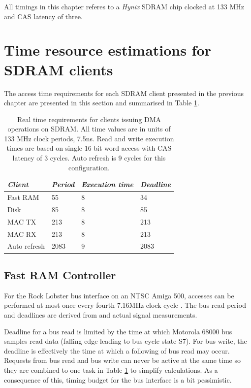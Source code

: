 \documentclass[a4paper]{report}
\begin{document}
All timings in this chapter referes to a \emph{Hynix} SDRAM
chip clocked at 133 MHz and CAS latency of three.

\section{Time resource estimations for SDRAM clients}
The access time requirements for each SDRAM client presented
in the previous chapter are presented in this section and
summarised in Table \ref{sdram_clients}.

\begin{table}
\begin{tabular}{*4l}    \toprule
\emph{Client} & \emph{Period} & \emph{Execution time} & \emph{Deadline} \\
\midrule
Fast RAM      & 55    & 8 & 34   \\
Disk          & 85    & 8 & 85   \\
MAC TX        & 213   & 8 & 213  \\
MAC RX        & 213   & 8 & 213  \\
Auto refresh  & 2083  & 9 & 2083 \\
\bottomrule
 \hline
\end{tabular}
\caption{Real time requirements for clients issuing DMA
operations on SDRAM.  All time values are in units of 133 MHz
clock periods, 7.5ns.  Read and write execution times are based on single 16
bit word access with CAS latency of 3 cycles. Auto refresh is 9 cycles
for this configuration.}
\label{sdram_clients}
\end{table}

\subsection{Fast RAM Controller}
For the Rock Lobster bus interface on an NTSC Amiga 500,
accesses can be performed at most once every fourth 7.16MHz
clock cycle \cite{mc68000um}.  The bus read period and
deadlines are derived from \cite{mc68000um} and actual signal
measurements.

Deadline for a bus read is limited by the time at which Motorola
68000 bus samples read data (falling edge leading to bus cycle
state S7).  For bus write, the deadline is effectively the time
at which a following of bus read may occur.  Requests from
bus read and bus write can never be active at the same time
so they are combined to one task in Table \ref{sdram_clients}
to simplify calculations. As a consequence of this, timing
budget for the bus interface is a bit pessimistic.
\end{document}
